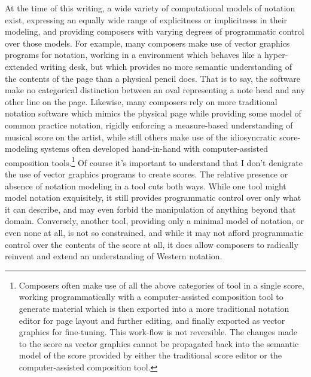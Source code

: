 At the time of this writing, a wide variety of computational models of notation
exist\cite{ baca2015tenor, trevino2013compositional}, expressing an equally
wide range of explicitness or implicitness in their modeling, and providing
composers with varying degrees of programmatic control over those models. For
example, many composers make use of vector graphics programs for notation,
working in a environment which behaves like a hyper-extended writing desk, but
which provides no more semantic understanding of the contents of the page than
a physical pencil does. That is to say, the software make no categorical
distinction between an oval representing a note head and any other line on the
page. Likewise, many composers rely on more traditional notation software which
mimics the physical page while providing some model of common practice
notation, rigidly enforcing a measure-based understanding of musical
score on the artist, while still others make use of the idiosyncratic
score-modeling systems often developed hand-in-hand with computer-assisted
composition tools.\footnote{Composers often make use of all the above
categories of tool in a single score, working programmatically with a
computer-assisted composition tool to generate material which is then exported
into a more traditional notation editor for page layout and further editing,
and finally exported as vector graphics for fine-tuning. This work-flow is not
reversible. The changes made to the score as vector graphics cannot be
propagated back into the semantic model of the score provided by either the
traditional score editor or the computer-assisted composition tool.} Of course
it's important to understand that I don't denigrate the use of vector graphics
programs to create scores. The relative presence or absence of notation
modeling in a tool cuts both ways. While one tool might model notation
exquisitely, it still provides programmatic control over only what it can
describe, and may even forbid the manipulation of anything beyond that domain.
Conversely, another tool, providing only a minimal model of notation, or even
none at all, is not so constrained, and while it may not afford programmatic
control over the contents of the score at all, it does allow composers to
radically reinvent and extend an understanding of Western notation.

